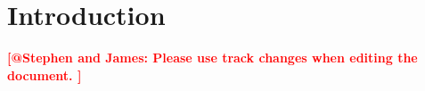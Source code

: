 \documentclass{article}
\newcommand{\note}[1]{\textbf{\textcolor{red}{[#1]}}}
\begin{document}
\begin{abstract}
\note{this needs to be written starting from more general to more specific. it starts with the mode name with no background. abstract should  communicate why people should read this paper and what to expect what to learn from it. technical details are not needed generally.}
\end{abstract}


\onehalfspacing

\section{Introduction}\label{sec:intro}


\note{@Stephen and James: Please use track changes when editing the document. }
\end{document}
